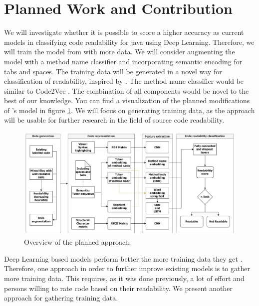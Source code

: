 \documentclass[%
class=scrreprt,
chapterprefix=false,%
open=right,%
twoside=false,%
paper=a4,%
logofile={Logo\_zentral\_farbig\_EN.png},%
thesistype=masterproposal,%
UKenglish,%
]{se2thesis}
\begin{document}
	\section{Planned Work and Contribution} \label{Planned Work and Contribution}
	We will investigate whether it is possible to score a higher accuracy as current models in classifying code readability for java using Deep Learning. Therefore, we will train the model from \citeauthor{mi2022towards} \cite{mi2022towards} with more data. We will consider augmenting the model with a method name classifier and incorporating semantic encoding for tabs and spaces. The training data will be generated in a novel way for classification of readability, inspired by \citeauthor{loriot2022styler} \cite{loriot2022styler}. The method name classifier would be similar to Code2Vec \cite{alon2019code2vec}. The combination of all components would be novel to the best of our knowledge. You can find a visualization of the planned modifications of \citeauthor{mi2022towards}'s model in figure \ref{fig:model_pipeline}. We will focus on generating training data, as the approach will be usable for further research in the field of source code readability.\\
	
	\begin{figure}[t]
		\centering
		\includegraphics[width=\textwidth]{Model_pipeline.png}
		\caption{Overview of the planned approach.}
		\label{fig:model_pipeline}
	\end{figure}
	
	Deep Learning based models perform better the more training data they get \cite{hestness2017deep}. Therefore, one approach in order to further improve existing models is to gather more training data.
	This requires, as it was done previously, a lot of effort and persons willing to rate code based on their readability. We present another approach for gathering training data.
	
\end{document}
